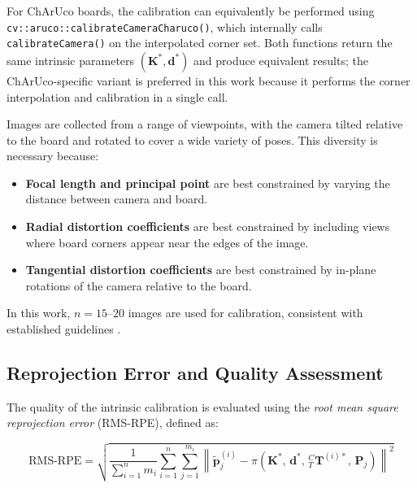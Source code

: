 For ChArUco boards, the calibration can equivalently be performed using
\texttt{cv::aruco::calibrateCameraCharuco()}, which internally calls
\texttt{calibrateCamera()} on the interpolated corner set. Both functions
return the same intrinsic parameters $(\mathbf{K}^*, \mathbf{d}^*)$ and produce equivalent results;
the ChArUco-specific variant is preferred in this work because it performs
the corner interpolation and calibration in a single call.

Images are collected from a range of viewpoints, with the camera tilted relative to the board and
rotated to cover a wide variety of poses. This diversity is necessary because:

\begin{itemize}
    \item \textbf{Focal length and principal point} are best constrained by
    varying the distance between camera and board.
    \item \textbf{Radial distortion coefficients} are best constrained by
    including views where board corners appear near the edges of the image.
    \item \textbf{Tangential distortion coefficients} are best constrained
    by in-plane rotations of the camera relative to the board.
\end{itemize}

\noindent In this work, $n = 15$--$20$ images are used for calibration,
consistent with established guidelines \cite{zhang2000flexible,
hartley2004multiple}.

\subsection{Reprojection Error and Quality Assessment}
\label{subsec:intr_reproj}

The quality of the intrinsic calibration is evaluated using the
\textit{root mean square reprojection error} (RMS-RPE), defined as:

\begin{equation}
    \text{RMS-RPE} =
    \sqrt{
        \frac{1}{\sum_{i=1}^{n} m_i}
        \sum_{i=1}^{n} \sum_{j=1}^{m_i}
        \left\lVert
            \tilde{\mathbf{p}}_j^{(i)} -
            \pi\!\left(\mathbf{K}^*,\, \mathbf{d}^*,\,
            {}^C_T\mathbf{T}^{(i)*},\, \mathbf{P}_j\right)
        \right\rVert^2
    }
    \label{eq:rms_rpe}
\end{equation}

